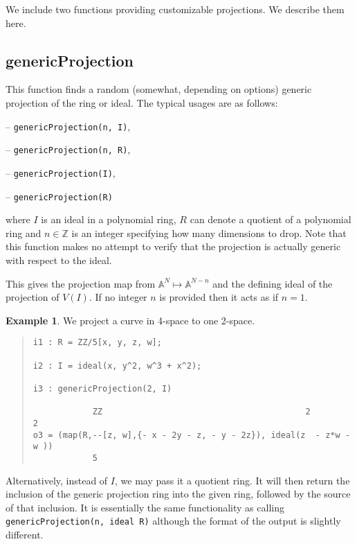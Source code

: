 \documentclass[11pt]{amsart}
\theoremstyle{definition}
\newtheorem{example}{Example}[section]
\begin{document}
We include two functions providing customizable projections. We describe them here. 


\subsection{genericProjection} 
This function finds a random (somewhat, depending on options) generic projection of the ring or ideal.
The typical usages are as follows: 
\vspace{0.5em}

-- {\tt genericProjection(n, I)},

-- {\tt genericProjection(n, R)},


-- {\tt genericProjection(I)},  

-- {\tt genericProjection(R)} 

\vspace{0.5em}
\noindent where 
$I$ is an ideal 
in a polynomial ring, 
$R$ can denote a quotient of a polynomial ring and 
$n\in \mathbb{Z}$ is
an integer specifying how many dimensions to drop.  Note that this function makes no attempt to verify that the projection is actually generic with respect to the ideal.


This gives the projection map from $\mathbb{A}^N \mapsto\mathbb{A}^{N-n}$ and the defining ideal of the projection of $V(I)$. If no integer $n$ is provided then it acts as if $n = 1$. 


\begin{example}	
    We project a curve in 4-space to one 2-space.
    ~~
  {{\small\color{blue}
  \begin{quote}
\begin{verbatim}
i1 : R = ZZ/5[x, y, z, w];

i2 : I = ideal(x, y^2, w^3 + x^2);

i3 : genericProjection(2, I)

            ZZ                                         2          2
o3 = (map(R,--[z, w],{- x - 2y - z, - y - 2z}), ideal(z  - z*w - w ))                   
            5
\end{verbatim}
\end{quote}
    }}
\end{example}\vspace{-1em}
Alternatively, instead of {$I$}, we may pass it a quotient ring.  It will then return the inclusion of the generic projection ring into the given ring, followed by the source of that inclusion.  It is essentially the same functionality as calling {\tt genericProjection(n, ideal R)} although the format of the output is slightly different. 
\end{document}
